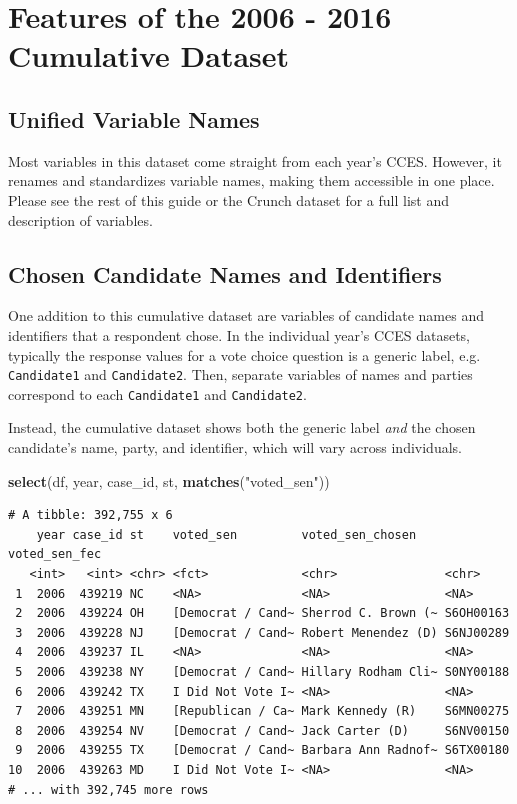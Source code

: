 \documentclass[10pt,article,oneside]{memoir}
\theoremstyle{definition}
\newenvironment{Shaded}{\begin{snugshade}}{\end{snugshade}}
\newcommand{\KeywordTok}[1]{\textcolor[rgb]{0.13,0.29,0.53}{\textbf{#1}}}
\newcommand{\StringTok}[1]{\textcolor[rgb]{0.31,0.60,0.02}{#1}}
\newcommand{\NormalTok}[1]{#1}
\begin{document}
\section{Features of the 2006 - 2016 Cumulative
Dataset}\label{features-of-the-2006---2016-cumulative-dataset}

\subsection{Unified Variable Names}\label{unified-variable-names}

Most variables in this dataset come straight from each year's CCES.
However, it renames and standardizes variable names, making them
accessible in one place. Please see the rest of this guide or the Crunch
dataset for a full list and description of variables.

\subsection{Chosen Candidate Names and
Identifiers}\label{chosen-candidate-names-and-identifiers}

One addition to this cumulative dataset are variables of candidate names
and identifiers that a respondent chose. In the individual year's CCES
datasets, typically the response values for a vote choice question is a
generic label, e.g. \texttt{Candidate1} and \texttt{Candidate2}. Then,
separate variables of names and parties correspond to each
\texttt{Candidate1} and \texttt{Candidate2}.

Instead, the cumulative dataset shows both the generic label \emph{and}
the chosen candidate's name, party, and identifier, which will vary
across individuals.

\begin{Shaded}
\begin{Highlighting}[]
\KeywordTok{select}\NormalTok{(df, year, case_id, st, }\KeywordTok{matches}\NormalTok{(}\StringTok{"voted_sen"}\NormalTok{))}
\end{Highlighting}
\end{Shaded}

\begin{verbatim}
# A tibble: 392,755 x 6
    year case_id st    voted_sen         voted_sen_chosen    voted_sen_fec
   <int>   <int> <chr> <fct>             <chr>               <chr>        
 1  2006  439219 NC    <NA>              <NA>                <NA>         
 2  2006  439224 OH    [Democrat / Cand~ Sherrod C. Brown (~ S6OH00163    
 3  2006  439228 NJ    [Democrat / Cand~ Robert Menendez (D) S6NJ00289    
 4  2006  439237 IL    <NA>              <NA>                <NA>         
 5  2006  439238 NY    [Democrat / Cand~ Hillary Rodham Cli~ S0NY00188    
 6  2006  439242 TX    I Did Not Vote I~ <NA>                <NA>         
 7  2006  439251 MN    [Republican / Ca~ Mark Kennedy (R)    S6MN00275    
 8  2006  439254 NV    [Democrat / Cand~ Jack Carter (D)     S6NV00150    
 9  2006  439255 TX    [Democrat / Cand~ Barbara Ann Radnof~ S6TX00180    
10  2006  439263 MD    I Did Not Vote I~ <NA>                <NA>         
# ... with 392,745 more rows
\end{verbatim}
\end{document}
